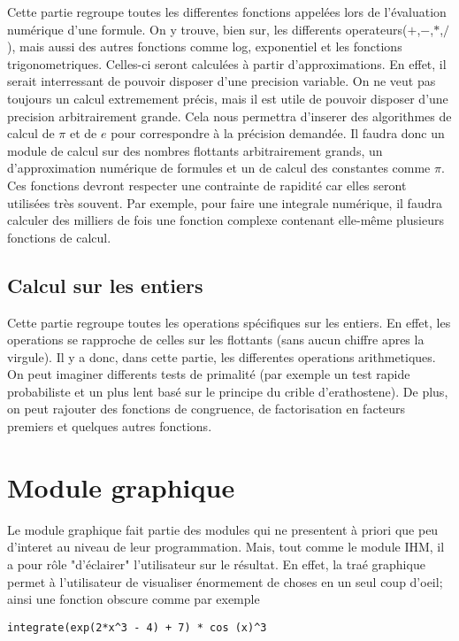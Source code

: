 \documentclass[french,12pt]{report}
\begin{document}
Cette partie regroupe toutes les differentes fonctions appel\'ees lors
de l'\'evaluation  num\'erique d'une formule.  On y trouve,  bien sur,
les  differents  operateurs($+$,$-$,$*$,$/$),  mais aussi  des  autres
fonctions     comme    log,     exponentiel    et     les    fonctions
trigonometriques.    Celles-ci   seront    calcul\'ees    \`a   partir
d'approximations. En effet, il serait interressant de pouvoir disposer
d'une  precision   variable.  On  ne  veut  pas   toujours  un  calcul
extremement  pr\'ecis, mais  il est  utile de  pouvoir  disposer d'une
precision  arbitrairement grande.  Cela nous  permettra  d'inserer des
algorithmes  de calcul de  $\pi$ et  de $e$  pour correspondre  \`a la
pr\'ecision demand\'ee.   Il faudra donc  un module de calcul  sur des
nombres   flottants    arbitrairement   grands,   un   d'approximation
num\'erique  de  formules  et   un  de  calcul  des  constantes  comme
$\pi$. Ces  fonctions devront  respecter une contrainte  de rapidit\'e
car elles  seront utilis\'ees tr\`es souvent. Par  exemple, pour faire
une integrale num\'erique, il faudra calculer des milliers de fois une
fonction complexe contenant elle-m\^eme plusieurs fonctions de calcul.

\subsection{Calcul sur les entiers}

Cette  partie regroupe  toutes  les operations  sp\'ecifiques sur  les
entiers.   En effet,  les operations  se rapproche  de celles  sur les
flottants (sans  aucun chiffre  apres la virgule).  Il y a  donc, dans
cette  partie,  les  differentes  operations  arithmetiques.  On  peut
imaginer differents  tests de primalit\'e (par exemple  un test rapide
probabiliste  et  un  plus  lent  bas\'e sur  le  principe  du  crible
d'erathostene). De plus, on peut rajouter des fonctions de congruence,
de factorisation en facteurs premiers et quelques autres fonctions.


\section{Module graphique}

Le  module graphique  fait partie  des modules  qui ne  presentent \`a
priori que peu  d'interet au niveau de leur  programmation. Mais, tout
comme le module IHM, il a pour r\^ole "d'\'eclairer" l'utilisateur sur
le r\'esultat. En effet,  la tra\'e graphique permet \`a l'utilisateur
de visualiser \'enormement de choses en un seul coup d'oeil; ainsi une
fonction obscure comme par exemple
\begin{center}
\verb!integrate(exp(2*x^3 - 4) + 7) * cos (x)^3!
\end{center}
\end{document}
